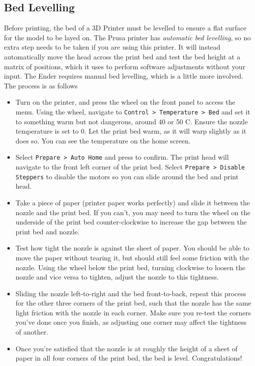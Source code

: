 \documentclass[12pt]{report}
\begin{document}
\subsection*{Bed Levelling}
\label{sec:levelling}

Before printing, the bed of a 3D Printer must be levelled to ensure a flat
surface for the model to be layed on. The Prusa printer has \textit{automatic
bed levelling}, so no extra step needs to be taken if you are using this
printer. It will instead automatically move the head across the print bed and
test the bed height at a matrix of positions, which it uses to perform software
adjustments without your input. The Ender requires manual bed levelling, which
is a little more involved. The process is as follows

\begin{itemize}
    \item Turn on the printer, and press the wheel on the front panel to access
        the menu. Using the wheel, navigate to \texttt{Control > Temperature >
        Bed} and set it to something warm but not dangerous, around 40 or 50
        \textdegree C. Ensure the nozzle temperature is set to 0. Let the
        print bed warm, as it will warp slightly as it does so. You can see the
        temperature on the home screen.
    \item Select \texttt{Prepare > Auto Home} and press to confirm. The print
        head will navigate to the front left corner of the print bed. Select
        \texttt{Prepare > Disable Steppers} to disable the motors so you can
        slide around the bed and print head.
    \item Take a piece of paper (printer paper works perfectly) and slide it
        between the nozzle and the print bed. If you can't, you may need to turn
        the wheel on the underside of the print bed counter-clockwise to
        increase the gap between the print bed and nozzle.
    \item Test how tight the nozzle is against the sheet of paper. You should be
        able to move the paper without tearing it, but should still feel some
        friction with the nozzle. Using the wheel below the print bed, turning
        clockwise to loosen the nozzle and vice versa to tighten, adjust the
        nozzle to this tightness.
    \item Sliding the nozzle left-to-right and the bed front-to-back, repeat
        this process for the other three corners of the print bed, such that
        the nozzle has the same light friction with the nozzle in each corner.
        Make sure you re-test the corners you've done once you finish, as
        adjusting one corner may affect the tightness of another.
   \item Once you're satisfied that the nozzle is at roughly the height of a
        sheet of paper in all four corners of the print bed, the bed is level.
        Congratulations!
\end{itemize}
\end{document}

